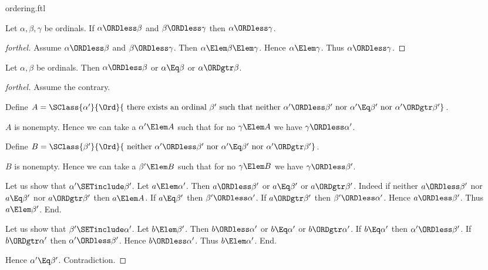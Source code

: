 \documentclass{stex}
\begin{document}
\begin{smodule}{ordering.ftl}
\begin{proposition}[forthel]
  Let $\alpha, \beta, \gamma$ be ordinals.
  If $\alpha \ORDless \beta$ and $\beta \ORDless \gamma$ then $\alpha \ORDless \gamma$.
\end{proposition}
\begin{proof}[forthel]
  Assume $\alpha \ORDless \beta$ and $\beta \ORDless \gamma$.
  Then $\alpha \Elem \beta \Elem \gamma$.
  Hence $\alpha \Elem \gamma$.
  Thus $\alpha \ORDless \gamma$.
\end{proof}

\begin{proposition}[forthel]
  Let $\alpha, \beta$ be ordinals.
  Then $\alpha \ORDless \beta$ or $\alpha \Eq \beta$ or $\alpha \ORDgtr \beta$.
\end{proposition}
\begin{proof}[forthel]
  Assume the contrary.
  
  Define $A = \SClass{\alpha'}{\Ord}{\text{ there exists an ordinal }\beta'\text{ such that neither }\alpha' \ORDless \beta'\text{ nor }\alpha' \Eq \beta'\text{ nor }\alpha' \ORDgtr \beta'}$.
  
  $A$ is nonempty.
  Hence we can take a $\alpha' \Elem A$ such that for no $\gamma \Elem A$ we have $\gamma \ORDless \alpha'$.
  
  Define $B = \SClass{\beta'}{\Ord}{\text{ neither }\alpha' \ORDless \beta'\text{ nor }\alpha' \Eq \beta'\text{ nor }\alpha' \ORDgtr \beta'}$.
  
  $B$ is nonempty.
  Hence we can take a $\beta' \Elem B$ such that for no $\gamma \Elem B$ we have $\gamma \ORDless \beta'$.

  Let us show that $\alpha' \SETinclude \beta'$.
    Let $a \Elem \alpha'$.
    Then $a \ORDless \beta'$ or $a \Eq \beta'$ or $a \ORDgtr \beta'$.
    Indeed if neither $a \ORDless \beta'$ nor $a \Eq \beta'$ nor $a \ORDgtr \beta'$ then
    $a \Elem A$.
    If $a \Eq \beta'$ then $\beta' \ORDless \alpha'$.
    If $a \ORDgtr \beta'$ then $\beta' \ORDless \alpha'$.
    Hence $a \ORDless \beta'$.
    Thus $a \Elem \beta'$.
  End.

  Let us show that $\beta' \SETinclude \alpha'$.
    Let $b \Elem \beta'$.
    Then $b \ORDless \alpha'$ or $b \Eq \alpha'$ or $b \ORDgtr \alpha'$.
    If $b \Eq \alpha'$ then $\alpha' \ORDless \beta'$.
    If $b \ORDgtr \alpha'$ then $\alpha' \ORDless \beta'$.
    Hence $b \ORDless \alpha'$.
    Thus $b \Elem \alpha'$.
  End.

  Hence $\alpha' \Eq \beta'$.
  Contradiction.
\end{proof}


\end{smodule}
\end{document}
